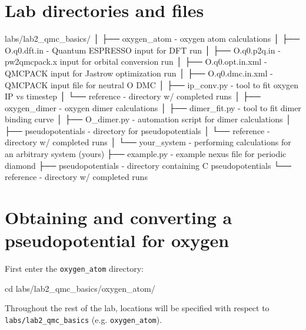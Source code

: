 \section{Lab directories and files}

\begin{shade}
labs/lab2_qmc_basics/
│
├── oxygen_atom           - oxygen atom calculations 
│   ├── O.q0.dft.in          - Quantum ESPRESSO input for DFT run
│   ├── O.q0.p2q.in          - pw2qmcpack.x input for orbital conversion run
│   ├── O.q0.opt.in.xml      - QMCPACK input for Jastrow optimization run
│   ├── O.q0.dmc.in.xml      - QMCPACK input file for neutral O DMC
│   ├── ip_conv.py           - tool to fit oxygen IP vs timestep
│   └── reference            - directory w/ completed runs
│
├── oxygen_dimer          - oxygen dimer calculations
│   ├── dimer_fit.py         - tool to fit dimer binding curve
│   ├── O_dimer.py           - automation script for dimer calculations
│   ├── pseudopotentials     - directory for pseudopotentials
│   └── reference            - directory w/ completed runs
│
└── your_system           - performing calculations for an arbitrary system (yours)
    ├── example.py           - example nexus file for periodic diamond
    ├── pseudopotentials     - directory containing C pseudopotentials
    └── reference            - directory w/ completed runs

\end{shade}





\section{Obtaining and converting a pseudopotential for oxygen}
\label{sec:lqb_pseudo}
First enter the \texttt{oxygen\_atom} directory:
\begin{shade}
cd labs/lab2_qmc_basics/oxygen_atom/
\end{shade}
\noindent
Throughout the rest of the lab, locations will be specified with respect to \texttt{labs/lab2\_qmc\_basics} (e.g. \texttt{oxygen\_atom}).

